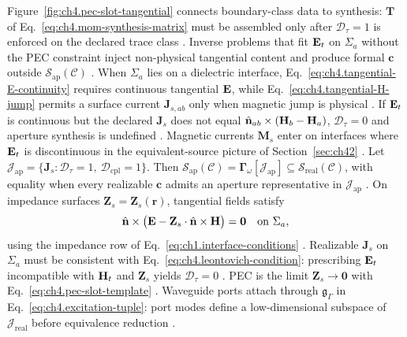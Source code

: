 Figure~\ref{fig:ch4.pec-slot-tangential} connects boundary-class data to synthesis: \(\mathbf{T}\) of
Eq.~\eqref{eq:ch4.mom-synthesis-matrix} must be assembled only after \(\mathcal{D}_{\tau}=1\) is enforced on the
declared trace class \cite{harrington2001}. Inverse problems that fit \(\mathbf{E}_{t}\) on \(\Sigma_{a}\) without
the PEC constraint inject non-physical tangential content and produce formal \(\mathbf{c}\) outside
\(\mathcal{S}_{\mathrm{ap}}(\mathcal{C})\) \cite{devaney2004}.
When \(\Sigma_{a}\) lies on a dielectric interface, Eq.~\eqref{eq:ch4.tangential-E-continuity} requires continuous
tangential \(\mathbf{E}\), while Eq.~\eqref{eq:ch4.tangential-H-jump} permits a surface current \(\mathbf{J}_{s,ab}\) only when
magnetic jump is physical \cite{stratton1941}. If \(\mathbf{E}_{t}\) is continuous but the declared \(\mathbf{J}_{s}\) does not
equal \(\hat{\mathbf{n}}_{ab}\times(\mathbf{H}_{b}-\mathbf{H}_{a})\), \(\mathcal{D}_{\tau}=0\) and aperture synthesis is undefined
\cite{harrington2001}. Magnetic currents \(\mathbf{M}_{s}\) enter on interfaces where \(\mathbf{E}_{t}\) is discontinuous in
the equivalent-source picture of Section~\ref{sec:ch42} \cite{collin2001}.
\label{cor:ch4.tangential-range}
Let \(\mathcal{J}_{\mathrm{ap}}=\{\mathbf{J}_{s}:\mathcal{D}_{\tau}=1,\ \mathcal{D}_{\mathrm{cpl}}=1\}\). Then
\(\mathcal{S}_{\mathrm{ap}}(\mathcal{C})=\boldsymbol{\Gamma}_\omega[\mathcal{J}_{\mathrm{ap}}]\subseteq
\mathcal{S}_{\mathrm{real}}(\mathcal{C})\), with equality when every realizable \(\mathbf{c}\) admits an aperture
representative in \(\mathcal{J}_{\mathrm{ap}}\) \cite{stratton1941}.
On impedance surfaces \(\mathbf{Z}_{s}=\mathbf{Z}_{s}(\mathbf{r})\), tangential fields satisfy
\begin{equation}
\label{eq:ch4.leontovich-condition}
\hat{\mathbf{n}}\times\big(\mathbf{E}-\mathbf{Z}_{s}\cdot\hat{\mathbf{n}}\times\mathbf{H}\big)=\mathbf{0}
\quad\text{on }\Sigma_{a},
\end{equation}
using the impedance row of Eq.~\eqref{eq:ch1.interface-conditions} \cite{stratton1941}. Realizable
\(\mathbf{J}_{s}\) on \(\Sigma_{a}\) must be consistent with Eq.~\eqref{eq:ch4.leontovich-condition}: prescribing
\(\mathbf{E}_{t}\) incompatible with \(\mathbf{H}_{t}\) and \(\mathbf{Z}_{s}\) yields \(\mathcal{D}_{\tau}=0\)
\cite{collin2001}. PEC is the limit \(\mathbf{Z}_{s}\to\mathbf{0}\) with
Eq.~\eqref{eq:ch4.pec-slot-template} \cite{stratton1941}.
Waveguide ports attach through \(\mathfrak{g}_\Gamma\) in Eq.~\eqref{eq:ch4.excitation-tuple}: port modes define a
low-dimensional subspace of \(\mathcal{J}_{\mathrm{real}}\) before equivalence reduction \cite{collin2001}.
